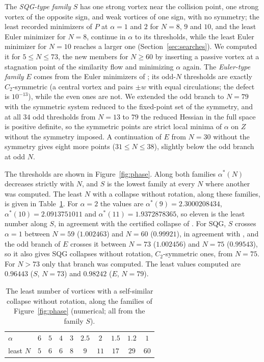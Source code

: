 \documentclass[11pt]{article}
\theoremstyle{definition}
\begin{document}
The \emph{SQG-type family} $S$ has one strong vortex near the collision point, one strong vortex of the opposite sign, and weak vortices of one sign, with no symmetry; the least recorded minimizers of $P$ at $\alpha = 1$ and $2$ for $N = 8$, $9$ and $10$, and the least Euler minimizer for $N = 8$, continue in $\alpha$ to its thresholds, while the least Euler minimizer for $N = 10$ reaches a larger one (Section~\ref{sec:searches}). We computed it for $5 \le N \le 73$, the new members for $N \ge 60$ by inserting a passive vortex at a stagnation point of the similarity flow and minimizing $\alpha$ again. The \emph{Euler-type family} $E$ comes from the Euler minimizers of \cite[Sect.~7]{mw2026}; its odd-$N$ thresholds are exactly $C_2$-symmetric (a central vortex and pairs $\pm w$ with equal circulations; the defect is $10^{-13}$), while the even ones are not. We extended the odd branch to $N = 79$ with the symmetric system reduced to the fixed-point set of the symmetry, and at all $34$ odd thresholds from $N = 13$ to $79$ the reduced Hessian in the full space is positive definite, so the symmetric points are strict local minima of $\alpha$ on $Z$ without the symmetry imposed. A continuation of $E$ from $N = 30$ without the symmetry gives eight more points ($31 \le N \le 38$), slightly below the odd branch at odd $N$.

The thresholds are shown in Figure~\ref{fig:phase}. Along both families $\alpha^*(N)$ decreases strictly with $N$, and $S$ is the lowest family at every $N$ where another was computed. The least $N$ with a collapse without rotation, along these families, is given in Table~\ref{tab:leastN}. For $\alpha = 2$ the values are $\alpha^*(9) = 2.3000208434$, $\alpha^*(10) = 2.0913751011$ and $\alpha^*(11) = 1.9372878365$, so eleven is the least number along $S$, in agreement with the certified collapse of \cite[Theorem~5(a)]{mw2026}. For SQG, $S$ crosses $\alpha = 1$ between $N = 59$ ($1.002463$) and $N = 60$ ($0.99921$), in agreement with \cite[Theorem~5(b)]{mw2026}, and the odd branch of $E$ crosses it between $N = 73$ ($1.002456$) and $N = 75$ ($0.99543$), so it also gives SQG collapses without rotation, $C_2$-symmetric ones, from $N = 75$. For $N > 73$ only that branch was computed. The least values computed are $0.96443$ ($S$, $N = 73$) and $0.98242$ ($E$, $N = 79$).

\begin{table}[t]
\centering
\small
\begin{tabular}{@{}lccccccccc@{}}
\toprule
$\alpha$ & $6$ & $5$ & $4$ & $3$ & $2.5$ & $2$ & $1.5$ & $1.2$ & $1$ \\
least $N$ & $5$ & $6$ & $6$ & $8$ & $9$ & $11$ & $17$ & $29$ & $60$ \\
\bottomrule
\end{tabular}
\caption{The least number of vortices with a self-similar collapse without rotation, along the families of Figure~\ref{fig:phase} (numerical; all from the family $S$).}\label{tab:leastN}
\end{table}
\end{document}
